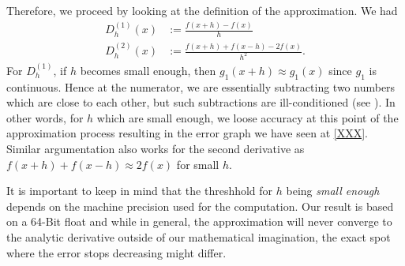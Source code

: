 Therefore, we proceed by looking at the definition of the approximation. We had
\begin{align*}
    D^{(1)}_h(x) &:= \frac{f(x + h) - f(x)}{h} \\
    D^{(2)}_h(x) &:= \frac{f(x + h) + f(x - h)- 2 f(x)}{h^2} \text{.}
\end{align*}
For \(D^{(1)}_h\), if \(h\) becomes small enough, then \(g_1(x + h) \approx g_1(x)\) since \(g_1\) is continuous. Hence at the numerator, we are essentially subtracting two numbers which are close to each other, but such subtractions are ill-conditioned (see \cite{Lecture}). In other words, for \(h\) which are small enough, we loose accuracy at this point of the approximation process resulting in the error graph we have seen at \ref{XXX}. Similar argumentation also works for the second derivative as \(f(x + h) + f(x - h) \approx 2 f(x)\) for small \(h\).

It is important to keep in mind that the threshhold for \(h\) being \textit{small enough} depends on the machine precision used for the computation. Our result is based on a 64-Bit float and while in general, the approximation will never converge to the analytic derivative outside of our mathematical imagination, the exact spot where the error stops decreasing might differ.